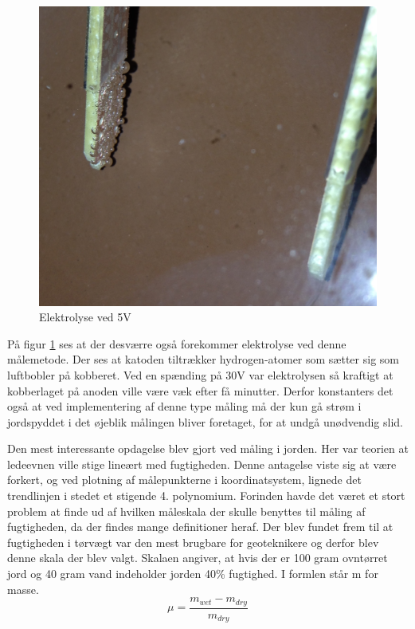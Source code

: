 \begin{figure}[H]
	\centering 
	\includegraphics[scale=0.1]{HardwareArkitektur/Sensore/Jordfugt_billeder/Elektrolyse.JPG}
	\caption{Elektrolyse ved 5V}
	\label{photo:Elektrolyse}
\end{figure}  

På figur \ref{photo:Elektrolyse} ses at der desværre også forekommer elektrolyse ved denne målemetode. Der ses at katoden tiltrækker hydrogen-atomer som sætter sig som luftbobler på kobberet. Ved en spænding på 30V var elektrolysen så kraftigt at kobberlaget på anoden ville være væk efter få minutter. Derfor konstanters det også at ved implementering af denne type måling må der kun gå strøm i jordspyddet i det øjeblik målingen bliver foretaget, for at undgå unødvendig slid.\newline

Den mest interessante opdagelse blev gjort ved måling i jorden. Her var teorien at ledeevnen ville stige lineært med fugtigheden. Denne antagelse viste sig at være forkert, og ved plotning af målepunkterne i koordinatsystem, lignede det trendlinjen i stedet et stigende 4. polynomium. Forinden havde det været et stort problem at finde ud af hvilken måleskala der skulle benyttes til måling af fugtigheden, da der findes mange definitioner heraf. Der blev fundet frem til at fugtigheden i tørvægt var den mest brugbare for geoteknikere og derfor blev denne skala der blev valgt. Skalaen angiver, at hvis der er 100 gram ovntørret jord og 40 gram vand indeholder jorden 40\% fugtighed. I formlen står m for masse.
$$ \mu = \frac{m_{wet}-m_{dry} }{m_{dry}}$$ \newline

